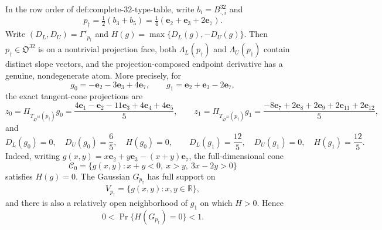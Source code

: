 In the row order of \(\text{def:complete-32-type-table}\), write \(b_i=B^{32}_{\cdot,i}\) and
\[
p_\dagger=\tfrac12(b_3+b_5)=\tfrac14(\mathbf e_2+\mathbf e_3+2\mathbf e_7).
\]
Write \((D_L,D_U)=\Gamma'_{p_\dagger}\) and \(H(g)=\max\{D_L(g),-D_U(g)\}\).  Then \(p_\dagger\in\mathfrak O^{32}\) is on a nontrivial projection face, both \(\Lambda_L(p_\dagger)\) and \(\Lambda_U(p_\dagger)\) contain distinct slope vectors, and the projection-composed endpoint derivative has a genuine, nondegenerate atom.  More precisely, for
\[
g_0=-\mathbf e_2-3\mathbf e_3+4\mathbf e_7,
\qquad
g_1=\mathbf e_2+\mathbf e_3-2\mathbf e_7,
\]
the exact tangent-cone projections are
\[
z_0=\Pi_{T_{\mathfrak O^{32}}(p_\dagger)}g_0
=\frac{4\mathbf e_1-\mathbf e_2-11\mathbf e_3+4\mathbf e_4+4\mathbf e_5}{5},
\qquad
z_1=\Pi_{T_{\mathfrak O^{32}}(p_\dagger)}g_1
=\frac{-8\mathbf e_7+2\mathbf e_8+2\mathbf e_9+2\mathbf e_{11}+2\mathbf e_{12}}{5},
\]
and
\[
D_L(g_0)=0,\quad D_U(g_0)=\frac65,\quad H(g_0)=0,
\qquad
D_L(g_1)=\frac{12}{5},\quad D_U(g_1)=0,\quad H(g_1)=\frac{12}{5}.
\]
Indeed, writing \(g(x,y)=x\mathbf e_2+y\mathbf e_3-(x+y)\mathbf e_7\), the full-dimensional cone
\[
\mathcal C_0=\{g(x,y):x+y<0,\ x>y,\ 3x-2y>0\}
\]
satisfies \(H(g)=0\).  The Gaussian \(G_{p_\dagger}\) has full support on
\[
V_{p_\dagger}=\{g(x,y):x,y\in\mathbb R\},
\]
and there is also a relatively open neighborhood of \(g_1\) on which \(H>0\).  Hence
\[
0<\Pr\{H(G_{p_\dagger})=0\}<1.
\]